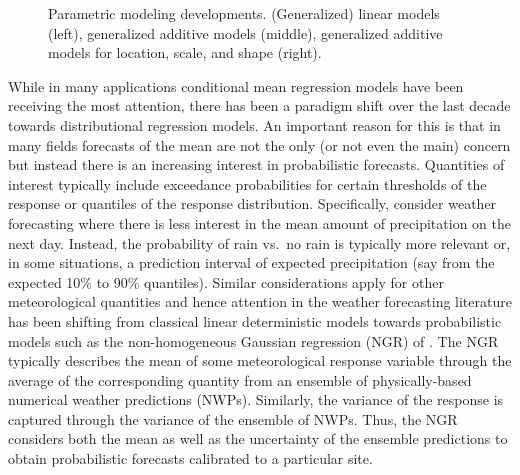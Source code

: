 \documentclass[aoas, preprint]{imsart}
\numberwithin{equation}{subsection}
\begin{document}
\begin{figure}[t!]
\caption{\label{fig:gam}Parametric modeling developments. (Generalized) linear models (left),
generalized additive models (middle), generalized additive models for location, scale, and shape (right).}
\end{figure}


While in many applications conditional mean regression models have been receiving
the most attention, there has been a paradigm shift over the last decade towards
distributional regression models. An important reason for this is that in many
fields forecasts of the mean are not the only (or not even the main) concern but
instead there is an increasing interest in probabilistic forecasts. Quantities of
interest typically include exceedance probabilities for certain thresholds of the
response or quantiles of the response distribution. Specifically, consider
weather forecasting where there is less interest in the mean amount of
precipitation on the next day. Instead, the probability of rain vs.\ no rain
is typically more relevant or, in some situations, a prediction interval of
expected precipitation (say from the expected 10\% to 90\% quantiles). Similar
considerations apply for other meteorological quantities and hence attention
in the weather forecasting literature has been shifting from classical linear 
deterministic models \citep{Glahn+Lowry:1972} towards probabilistic models such as the
non-homogeneous Gaussian regression (NGR) of \cite{Gneiting+Raftery+Westveld:2005}.
The NGR typically describes the mean of some meteorological response variable through
the average of the corresponding quantity from an ensemble of physically-based
numerical weather predictions (NWPs). Similarly, the variance of the response
is captured through the variance of the ensemble of NWPs. Thus, the NGR
considers both the mean as well as the uncertainty of the ensemble predictions
to obtain probabilistic forecasts calibrated to a particular site.
\end{document}
